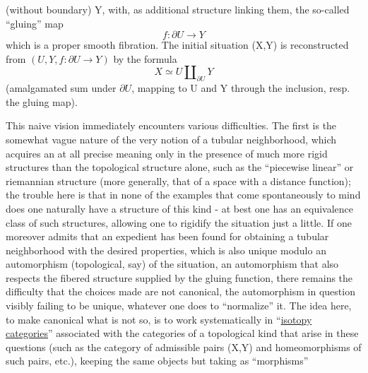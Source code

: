 
(without boundary) Y, with, as additional structure linking them,
the so-called ``gluing'' map
\[ f : \partial U \longrightarrow Y \]
which is a proper smooth fibration. The initial situation
(X,Y) is reconstructed from $(U,Y, f : \partial U \longrightarrow Y)$ by the
formula
\[ X \simeq U \amalg_{\partial U} Y \]
(amalgamated sum under $\partial U$, mapping to U and Y through the inclusion,
resp. the gluing map).

This naive vision immediately encounters various
difficulties. The first is the somewhat vague nature of the
very notion of a tubular neighborhood, which acquires an at all
precise meaning only in the presence of much more rigid structures
than the topological structure alone, such as the ``piecewise
linear'' or riemannian structure (more generally, that of a space with a
distance function); the trouble here is that in none of the examples
that come spontaneously to mind does one naturally have
a structure of this kind - at best one has an equivalence class
of such structures, allowing one to rigidify the situation
just a little. If one moreover admits that an expedient
has been found for obtaining a tubular neighborhood with the desired
properties, which is also unique modulo an automorphism
(topological, say) of the situation, an automorphism that also
respects the fibered structure supplied by the gluing function,
there remains the difficulty that the choices made are not canonical,
the automorphism in question visibly failing to be unique, whatever
one does to ``normalize'' it. The idea here, to make canonical
what is not so, is to work systematically in
``\uline{isotopy categories}'' associated with the categories of a topological
kind that arise in these questions (such as the category of
admissible pairs (X,Y) and homeomorphisms of such pairs,
etc.), keeping the same objects but taking as ``morphisms''


